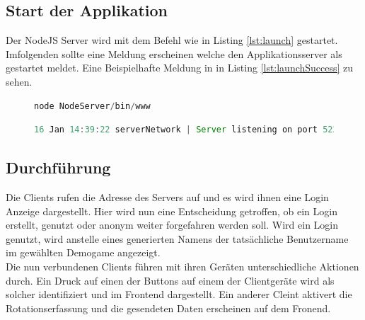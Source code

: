\documentclass[a4paper]{spie}  %
\begin{document}
\subsection{Start der Applikation}
Der NodeJS Server wird mit dem Befehl wie in Listing \ref{lst:launch} gestartet. Imfolgenden sollte eine Meldung erscheinen welche den Applikationsserver als gestartet meldet. Eine Beispielhafte Meldung in in Listing \ref{lst:launchSuccess} zu sehen.

\begin{figure}[h!]
	\centering
        \begin{lstlisting}[language=JavaScript,caption={Start der Applikation},label={lst:launch}]
           node NodeServer/bin/www
        \end{lstlisting}
\end{figure}
\begin{figure}[h!]
	\centering
        \begin{lstlisting}[language=JavaScript,caption={Start der Applikation},label={lst:launchSuccess}]
           16 Jan 14:39:22 serverNetwork | Server listening on port 5222
        \end{lstlisting}
\end{figure}
\subsection{Durchführung}
Die Clients rufen die Adresse des Servers auf und es wird ihnen eine Login Anzeige dargestellt. Hier wird nun eine Entscheidung getroffen, ob ein Login erstellt, genutzt oder anonym weiter forgefahren werden soll.
Wird ein Login genutzt, wird anstelle eines generierten Namens der tatsächliche Benutzername im gewählten Demogame angezeigt. \\
Die nun verbundenen Clients führen mit ihren Geräten unterschiedliche Aktionen durch. Ein Druck auf einen der Buttons auf einem der Clientgeräte wird als solcher identifiziert und im Frontend dargestellt. Ein anderer Cleint aktivert die Rotationserfassung und die gesendeten Daten erscheinen auf dem Fronend.
\end{document}
